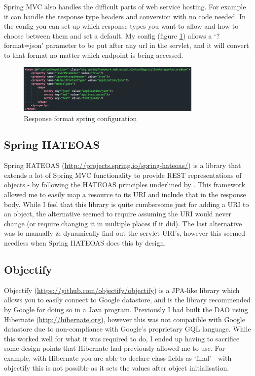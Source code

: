 \documentclass[12pt]{article}
\begin{document}
    Spring MVC also handles the difficult parts of web service hosting. For example it can handle the response type headers and conversion with no code needed. In the config you can set up which response types you want to allow and how to choose between them and set a default. My config (figure \ref{fig:response-format-config}) allows a ‘?format=json’ parameter to be put after any url in the servlet, and it will convert to that format no matter which endpoint is being accessed.

    \begin{figure}[ht]
      \centering
      \includegraphics[width=9cm]{response-format-config}
      \caption{Response format spring configuration}
      \label{fig:response-format-config}
    \end{figure}

  \subsection{Spring HATEOAS}
    Spring HATEOAS (\url{http://projects.spring.io/spring-hateoas/}) is a library that extends a lot of Spring MVC functionality to provide REST representations of objects - by following the HATEOAS principles underlined by \cite{fielding2000architectural}. This framework allowed me to easily map a resource to its URI and include that in the response body. While I feel that this library is quite cumbersome just for adding a URI to an object, the alternative seemed to require assuming the URI would never change (or require changing it in multiple places if it did). The last alternative was to manually \& dynamically find out the servlet URI's, however this seemed needless when Spring HATEOAS does this by design.

  \subsection{Objectify}
    \label{objectify}
    Objectify (\url{https://github.com/objectify/objectify}) is a JPA-like library which allows you to easily connect to Google datastore, and is the library recommended by Google for doing so in a Java program. Previously I had built the DAO using Hibernate (\url{http://hibernate.org}), however this was not compatible with Google datastore due to non-compliance with Google's proprietary GQL language. While this worked well for what it was required to do, I ended up having to sacrifice some design points that Hibernate had previously allowed me to use. For example, with Hibernate you are able to declare class fields as ‘final’ - with objectify this is not possible as it sets the values after object initialisation.
\end{document}
